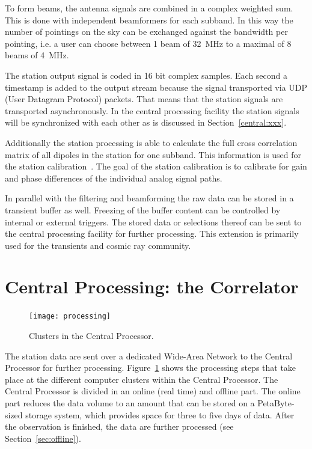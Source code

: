 \documentclass[journal]{IEEEtran}
\begin{document}
To form beams, the antenna signals are combined in a complex weighted sum. This is done with independent beamformers for each subband. In this way the number of pointings on the sky can be exchanged against the bandwidth per pointing, i.e. a user can choose between 1 beam of 32~MHz to a maximal of 8 beams of 4~MHz. 

The station output signal is coded in 16 bit complex samples. Each second a timestamp is added to the output stream because the signal transported via UDP (User Datagram Protocol) packets. That means that the station signals are transported asynchronously. In the central processing facility the station signals will be synchronized with each other as is discussed in Section~\ref{central:xxx}.

Additionally the station processing is able to calculate the full cross correlation matrix of all dipoles in the station for one subband. This information is used for the station calibration~\cite{stefan:xxx}. The goal of the station calibration is to calibrate for gain and phase differences of the individual analog signal paths. 

In parallel with the filtering and beamforming the raw data can be stored in a transient buffer as well. Freezing of the buffer content can be controlled by internal or external triggers. The stored data or selections thereof can be sent to the central processing facility for further processing. This extension is primarily used for the transients and cosmic ray community.


\section{Central Processing: the Correlator}

\begin{figure}
\begin{center}
\texttt{[image: processing]}
\end{center}
\caption{Clusters in the Central Processor.}
\label{fig:CEP}
\end{figure}

The station data are sent over a dedicated Wide-Area Network to the Central
Processor for further processing.
Figure~\ref{fig:CEP} shows the processing steps that take place at the
different computer clusters within the Central Processor.
The Central Processor is divided in an online (real time) and offline part.
The online part reduces the data volume to an amount that can be stored on
a PetaByte-sized storage system, which provides space for three to five days
of data.
After the observation is finished, the data are further processed (see
Section~\ref{sec:offline}).
\end{document}
